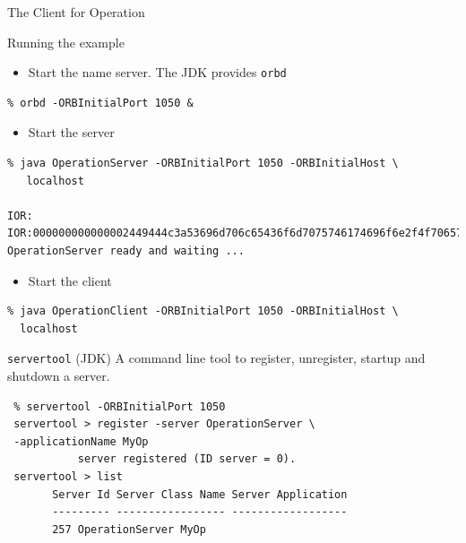 \documentclass[bigger,hyperref={colorlinks=true, urlcolor=red, plainpages=false, pdfpagelabels, bookmarksnumbered}]{beamer}
\begin{document}
\begin{frame}[label=sec-4-26]{The Client for Operation}
\end{frame}
\begin{frame}[fragile,label=sec-4-27]{Running the example}
 \begin{itemize}
\item Start the name server. The JDK provides \texttt{orbd}
\end{itemize}
\lstset{language=bash,label= ,caption= ,numbers=none}
\begin{lstlisting}
% orbd -ORBInitialPort 1050 &
\end{lstlisting}

\begin{itemize}
\item Start the server
\end{itemize}
\lstset{language=bash,label= ,caption= ,numbers=none}
\begin{lstlisting}
% java OperationServer -ORBInitialPort 1050 -ORBInitialHost \
   localhost

IOR: IOR:000000000000002449444c3a53696d706c65436f6d7075746174696f6e2f4f7065726174696f6e3a312e3000000000010000000000000086000102000000000d3139322e3136382e35362e310000cf3f00000031afabcb000000002083e61b0900000001000000000000000100000008526f6f74504f410000000008000000010000000014000000000000020000000100000020000000000001000100000002050100010001002000010109000000010001010000000026000000020002
OperationServer ready and waiting ...
\end{lstlisting}

\begin{itemize}
\item Start the client
\end{itemize}
\lstset{language=bash,label= ,caption= ,numbers=none}
\begin{lstlisting}
% java OperationClient -ORBInitialPort 1050 -ORBInitialHost \
  localhost
\end{lstlisting}
\end{frame}


\begin{frame}[fragile,label=sec-4-28]{\texttt{servertool} (JDK)}
 A command line tool to register, unregister, startup and shutdown a
server.

\lstset{language=bash,label= ,caption= ,numbers=none}
\begin{lstlisting}
 % servertool -ORBInitialPort 1050
 servertool > register -server OperationServer \
 -applicationName MyOp
           server registered (ID server = 0).
 servertool > list
       Server Id Server Class Name Server Application
       --------- ----------------- ------------------
       257 OperationServer MyOp
\end{lstlisting}
\end{frame}
\end{document}
